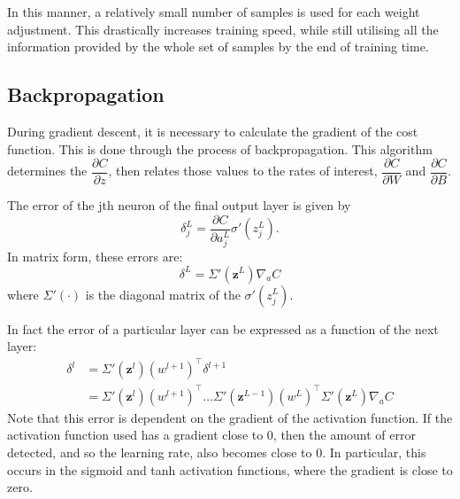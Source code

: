 \documentclass[honours,12pt]{unswthesis}
\numberwithin{equation}{section}
\begin{document}
In this manner, a relatively small number of samples is used for each weight adjustment. This drastically increases training speed, while still utilising all the information provided by the whole set of samples by the end of training time.

%
%
%


\subsection{Backpropagation}

During gradient descent, it is necessary to calculate the gradient of the cost function. This is done through the process of backpropagation. This algorithm determines the $\dfrac{\partial C}{\partial z}$, then relates those values to the rates of interest, $\dfrac{\partial C}{\partial W}$ and $\dfrac{\partial C}{\partial B}$.


The error of the jth neuron of the final output layer is given by
\[
	\delta_j^L = \dfrac{\partial C}{\partial a_j^L}\sigma'(z_j^L).
\]
In matrix form, these errors are:
\[
	\delta^L = \Sigma'(\mathbf{z}^L)\nabla_aC
\]
where $\Sigma'(\cdot)$ is the diagonal matrix of the $\sigma'(z_j^L)$.

In fact the error of a particular layer can be expressed as a function of the next layer:
\begin{align*}
	\delta^l & = \Sigma'(\mathbf{z}^l)(w^{l+1})^\top\delta^{l+1} \\
	& = \Sigma'(\mathbf{z}^l)(w^{l+1})^\top\ldots\Sigma'(\mathbf{z}^{L-1})(w^L)^\top\Sigma'(\mathbf{z}^L)\nabla_aC
\end{align*}
Note that this error is dependent on the gradient of the activation function. If the activation function used has a gradient close to 0, then the amount of error detected, and so the learning rate, also becomes close to 0. In particular, this occurs in the sigmoid and tanh activation functions, where the gradient is close to zero.
\end{document}
